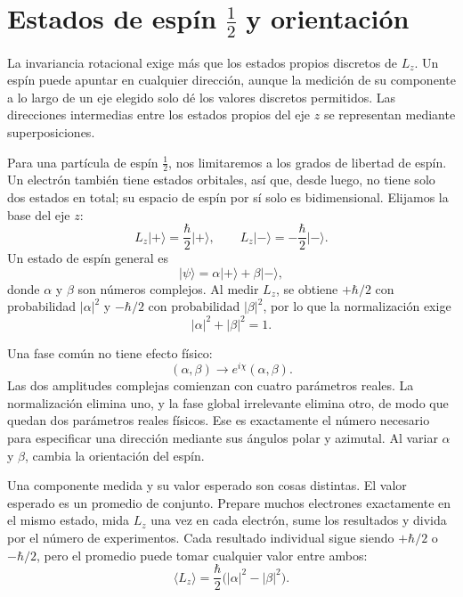 \section{Estados de espín \texorpdfstring{\(\tfrac12\)}{1/2} y orientación}

La invariancia rotacional exige más que los estados propios discretos de \(L_z\). Un espín puede apuntar en cualquier dirección, aunque la medición de su componente a lo largo de un eje elegido solo dé los valores discretos permitidos. Las direcciones intermedias entre los estados propios del eje \(z\) se representan mediante superposiciones.

Para una partícula de espín \(\tfrac12\), nos limitaremos a los grados de libertad de espín. Un electrón también tiene estados orbitales, así que, desde luego, no tiene solo dos estados en total; su espacio de espín por sí solo es bidimensional. Elijamos la base del eje \(z\):
\begin{equation}
L_z\lvert+\rangle=\frac{\hbar}{2}\lvert+\rangle,
\qquad
L_z\lvert-\rangle=-\frac{\hbar}{2}\lvert-\rangle.
\end{equation}
Un estado de espín general es
\begin{equation}
\lvert\psi\rangle
=
\alpha\lvert+\rangle+\beta\lvert-\rangle,
\end{equation}
donde \(\alpha\) y \(\beta\) son números complejos. Al medir \(L_z\), se obtiene \(+\hbar/2\) con probabilidad \(|\alpha|^2\) y \(-\hbar/2\) con probabilidad \(|\beta|^2\), por lo que la normalización exige
\begin{equation}
|\alpha|^2+|\beta|^2=1.
\end{equation}

Una fase común no tiene efecto físico:
\begin{equation}
(\alpha,\beta)\longrightarrow
e^{i\chi}(\alpha,\beta).
\end{equation}
Las dos amplitudes complejas comienzan con cuatro parámetros reales. La normalización elimina uno, y la fase global irrelevante elimina otro, de modo que quedan dos parámetros reales físicos. Ese es exactamente el número necesario para especificar una dirección mediante sus ángulos polar y azimutal. Al variar \(\alpha\) y \(\beta\), cambia la orientación del espín.

Una componente medida y su valor esperado son cosas distintas. El valor esperado es un promedio de conjunto. Prepare muchos electrones exactamente en el mismo estado, mida \(L_z\) una vez en cada electrón, sume los resultados y divida por el número de experimentos. Cada resultado individual sigue siendo \(+\hbar/2\) o \(-\hbar/2\), pero el promedio puede tomar cualquier valor entre ambos:
\begin{equation}
\langle L_z\rangle
=
\frac{\hbar}{2}\bigl(|\alpha|^2-|\beta|^2\bigr).
\end{equation}

